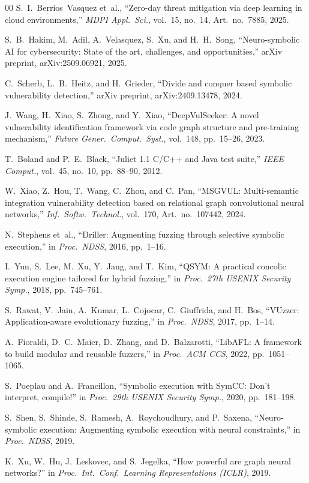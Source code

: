 \documentclass[10pt,conference]{IEEEtran}
\begin{document}
\begin{thebibliography}{00}
S.~I.~Berrios~Vasquez et~al.,
``Zero-day threat mitigation via deep learning in cloud environments,''
\emph{MDPI Appl.\ Sci.}, vol.~15, no.~14, Art.\ no.~7885, 2025.

S.~B.~Hakim, M.~Adil, A.~Velasquez, S.~Xu, and H.~H.~Song,
``Neuro-symbolic AI for cybersecurity: State of the art, challenges, and opportunities,''
arXiv preprint, arXiv:2509.06921, 2025.

C.~Scherb, L.~B.~Heitz, and H.~Grieder,
``Divide and conquer based symbolic vulnerability detection,''
arXiv preprint, arXiv:2409.13478, 2024.

J.~Wang, H.~Xiao, S.~Zhong, and Y.~Xiao,
``DeepVulSeeker: A novel vulnerability identification framework via code graph structure and pre-training mechanism,''
\emph{Future Gener.\ Comput.\ Syst.}, vol.~148, pp.~15--26, 2023.

T.~Boland and P.~E.~Black,
``Juliet 1.1 C/C++ and Java test suite,''
\emph{IEEE Comput.}, vol.~45, no.~10, pp.~88--90, 2012.

W.~Xiao, Z.~Hou, T.~Wang, C.~Zhou, and C.~Pan,
``MSGVUL: Multi-semantic integration vulnerability detection based on relational graph convolutional neural networks,''
\emph{Inf.\ Softw.\ Technol.}, vol.~170, Art.\ no.~107442, 2024.

N.~Stephens et~al.,
``Driller: Augmenting fuzzing through selective symbolic execution,''
in \emph{Proc.\ NDSS}, 2016, pp.~1--16.

I.~Yun, S.~Lee, M.~Xu, Y.~Jang, and T.~Kim,
``QSYM: A practical concolic execution engine tailored for hybrid fuzzing,''
in \emph{Proc.\ 27th USENIX Security Symp.}, 2018, pp.~745--761.

S.~Rawat, V.~Jain, A.~Kumar, L.~Cojocar, C.~Giuffrida, and H.~Bos,
``VUzzer: Application-aware evolutionary fuzzing,''
in \emph{Proc.\ NDSS}, 2017, pp.~1--14.

A.~Fioraldi, D.~C.~Maier, D.~Zhang, and D.~Balzarotti,
``LibAFL: A framework to build modular and reusable fuzzers,''
in \emph{Proc.\ ACM CCS}, 2022, pp.~1051--1065.

S.~Poeplau and A.~Francillon,
``Symbolic execution with SymCC: Don't interpret, compile!''
in \emph{Proc.\ 29th USENIX Security Symp.}, 2020, pp.~181--198.

S.~Shen, S.~Shinde, S.~Ramesh, A.~Roychoudhury, and P.~Saxena,
``Neuro-symbolic execution: Augmenting symbolic execution with neural constraints,''
in \emph{Proc.\ NDSS}, 2019.

K.~Xu, W.~Hu, J.~Leskovec, and S.~Jegelka,
``How powerful are graph neural networks?''
in \emph{Proc.\ Int.\ Conf.\ Learning Representations (ICLR)}, 2019.

\end{thebibliography}
\end{document}
